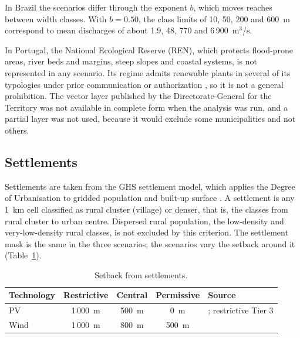In Brazil the scenarios differ through the exponent $b$, which moves
reaches between width classes. With $b=0.50$, the class limits of 10, 50,
200 and 600~m correspond to mean discharges of about 1.9, 48, 770 and
6\,900~m$^3$/s.

In Portugal, the National Ecological Reserve (REN), which protects
flood-prone areas, river beds and margins, steep slopes and coastal
systems, is not represented in any scenario. Its regime admits renewable
plants in several of its typologies under prior communication or
authorization \cite{portugal2008ren}, so it is not a general prohibition.
The vector layer published by the Directorate-General for the Territory
was not available in complete form when the analysis was run, and a
partial layer was not used, because it would exclude some municipalities
and not others.

\subsection{Settlements}
\label{subsec:g6_settlements}

Settlements are taken from the GHS settlement model, which applies the
Degree of Urbanisation to gridded population and built-up surface
\cite{schiavina2023smod}. A settlement is any 1~km cell classified as
rural cluster (village) or denser, that is, the classes from rural
cluster to urban centre. Dispersed rural population, the low-density and
very-low-density rural classes, is not excluded by this criterion. The
settlement mask is the same in the three scenarios; the scenarios vary
the setback around it (Table~\ref{tab:g6_setback}).

\begin{table}[htbp]
    \centering
    \caption{Setback from settlements.}
    \label{tab:g6_setback}
    \small
    \begin{tabular}{lcccl}
        \toprule
        Technology & Restrictive & Central & Permissive & Source \\
        \midrule
        PV   & 1\,000~m & 500~m & 0~m   & \cite{uyan2013,watson2015}; restrictive Tier 3 \\
        Wind & 1\,000~m & 800~m & 500~m & \cite{rediske2021,drechsler2017,lehmann2021,watson2015} \\
        \bottomrule
    \end{tabular}
\end{table}

